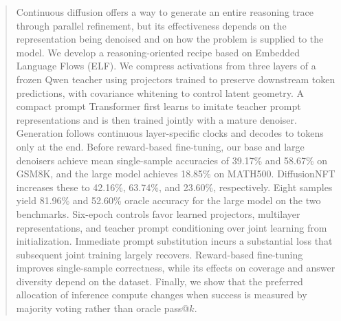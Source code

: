 \begin{abstract}
Continuous diffusion offers a way to generate an entire reasoning trace through parallel refinement, but its effectiveness depends on the representation being denoised and on how the problem is supplied to the model. We develop a reasoning-oriented recipe based on Embedded Language Flows (ELF). We compress activations from three layers of a frozen Qwen teacher using projectors trained to preserve downstream token predictions, with covariance whitening to control latent geometry. A compact prompt Transformer first learns to imitate teacher prompt representations and is then trained jointly with a mature denoiser. Generation follows continuous layer-specific clocks and decodes to tokens only at the end. Before reward-based fine-tuning, our base and large denoisers achieve mean single-sample accuracies of 39.17\% and 58.67\% on GSM8K, and the large model achieves 18.85\% on MATH500. DiffusionNFT increases these to 42.16\%, 63.74\%, and 23.60\%, respectively. Eight samples yield 81.96\% and 52.60\% oracle accuracy for the large model on the two benchmarks. Six-epoch controls favor learned projectors, multilayer representations, and teacher prompt conditioning over joint learning from initialization. Immediate prompt substitution incurs a substantial loss that subsequent joint training largely recovers. Reward-based fine-tuning improves single-sample correctness, while its effects on coverage and answer diversity depend on the dataset. Finally, we show that the preferred allocation of inference compute changes when success is measured by majority voting rather than oracle pass@$k$.
\end{abstract}
